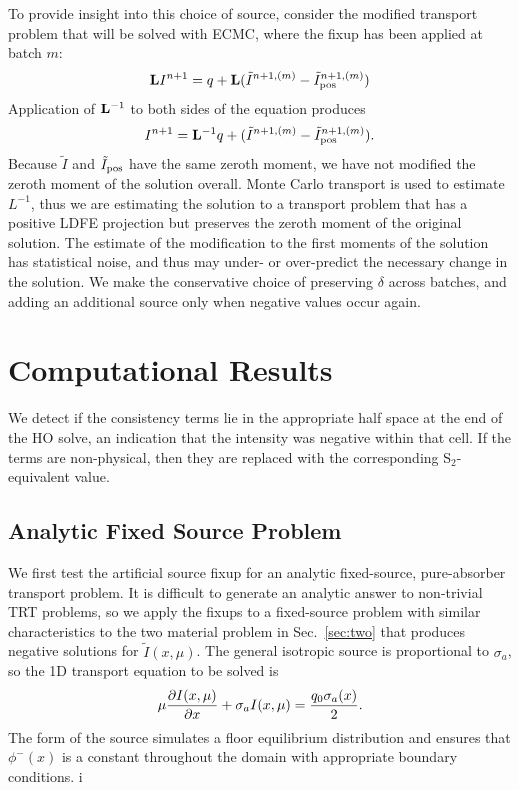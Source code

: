To provide insight into this choice of source, consider the modified transport problem
that will be solved with ECMC, where the fixup has been applied at batch $m$:
\begin{equation}
   \mathbf{L} I^{n+1} = q + \mathbf{L}(\tilde{I}^{n+1,(m)} -
    \tilde{I}^{n+1,(m)}_{\text{pos}})
\end{equation}
Application of $\mathbf{L}^{-1}$ to both sides of the equation produces
\begin{equation}
    I^{n+1} = \mathbf{L}^{-1} q + (\tilde{I}^{n+1,(m)} -
    \tilde{I}^{n+1,(m)}_{\text{pos}}).
\end{equation}
Because $\tilde I$ and $\tilde I_{\text{pos}}$ have the same zeroth moment, we have not modified
the zeroth moment of the solution overall.  Monte Carlo transport is used to estimate $L^{-1}$, thus 
we are estimating the solution to a transport problem that has a positive LDFE projection but preserves the
zeroth moment of the original solution.  The estimate of the modification to the first
moments of the solution has statistical noise, and thus may under- or over-predict the
necessary change in the solution.  We make the conservative choice of preserving $\delta$
across batches, and adding an additional source only when negative values occur again. 

\section{Computational Results}

We detect if
the consistency terms lie in the appropriate half space at the end of the HO solve,
an indication that the intensity was negative within that cell.  If the terms are non-physical, then
they are replaced with the corresponding S$_2$-equivalent value.

\subsection{Analytic Fixed Source Problem}

We first test the artificial source fixup for an analytic fixed-source, pure-absorber transport problem.  It is
difficult to generate an analytic answer to non-trivial TRT problems, so we apply the
fixups to a
fixed-source problem with similar characteristics to the two material problem in
Sec.~\ref{sec:two} that produces negative solutions for $\tilde I(x,\mu)$.  The general
isotropic source is proportional to $\sigma_a$, so the 1D transport equation to be solved is 
\begin{equation}\label{apptr}
    \mu \frac{\partial I(x,\mu)}{\partial x} + \sigma_a I(x,\mu) = \frac{q_0\sigma_a(x)}{2}.
\end{equation}
The form of the source simulates a floor equilibrium distribution and ensures that $\phi^-(x)$ is a
constant throughout the domain with appropriate boundary conditions. i

